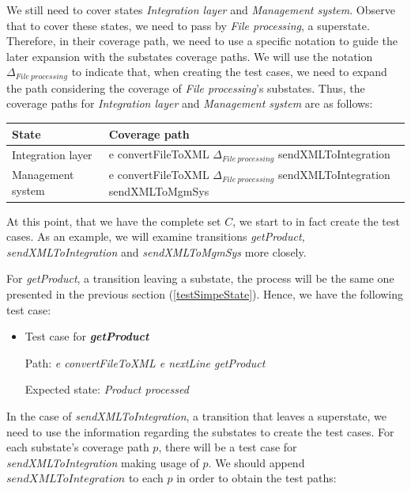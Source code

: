 We still need to cover states \textit{Integration layer} and \textit{Management system}. Observe that to cover these states, we need to pass by \textit{File processing}, a superstate. Therefore, in their coverage path, we need to use a specific notation to guide the later expansion with the substates coverage paths. We will use the notation $\Delta_{File\ processing}$ to indicate that, when creating the test cases, we need to expand the path considering the coverage of \textit{File processing}'s substates. Thus, the coverage paths for \textit{Integration layer} and \textit{Management system} are as follows:

\begin{center}
\begin{tabular}{| l | p{10cm}|}

\hline

State & Coverage path \\ \hline

Integration layer & e convertFileToXML $\Delta_{File\ processing}$ sendXMLToIntegration \\ \hline

Management system & e convertFileToXML $\Delta_{File\ processing}$ sendXMLToIntegration sendXMLToMgmSys\\

\hline
\end{tabular}
\end{center}

At this point, that we have the complete set $C$, we start to in fact create the test cases. As an example, we will examine transitions \textit{getProduct, sendXMLToIntegration} and \textit{sendXMLToMgmSys} more closely.

For \textit{getProduct}, a transition leaving a substate, the process will be the same one presented in the previous section (\ref{testSimpeState}). Hence, we have the following test case:

\begin{itemize}

\item Test case for \textit{\textbf{getProduct}}

Path: \textit{e convertFileToXML e nextLine getProduct}

Expected state: \textit{Product processed}

\end{itemize}

In the case of \textit{sendXMLToIntegration}, a transition that leaves a superstate, we need to use the information regarding the substates to create the test cases. For each substate's coverage path $p$, there will be a test case for \textit{sendXMLToIntegration} making usage of $p$. We should append $sendXMLToIntegration$ to each $p$ in order to obtain the test paths:

